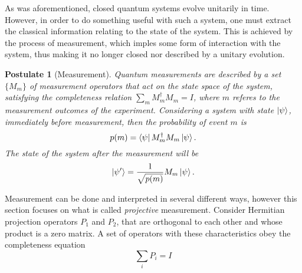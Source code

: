 \documentclass[../../dissertation.tex]{subfiles}
\newtheorem{post}{Postulate}
\begin{document}
As was aforementioned, closed quantum systems evolve unitarily in time.
However, in order to do something useful with such a system, one must extract
the classical information relating to the state of the system. This is achieved
by the process of measurement, which imples some form of interaction with the
system, thus making it no longer closed nor described by a unitary evolution.
\begin{post}[Measurement]
Quantum measurements are described by a set $\{M_m\}$ of measurement operators that act on the state space of the system, satisfying the completeness relation $\sum_m M_m^\dag M_m = I$, where $m$ referes to the measurement outcomes of the experiment. Considering a system with state $\ket{\psi}$, immediately before measurement, then the probability of event $m$ is
\begin{equation}
	p(m) = \bra{\psi} M_m^\dag M_m \ket{\psi}.
\end{equation}
The state of the system after the measurement will be
\begin{equation}
\ket{\psi'} = \frac{1}{\sqrt{p(m)}} M_m \ket{\psi}.
\end{equation}
\end{post}\par
Measurement can be done and interpreted in several different ways, however this
section focuses on what is called \textit{projective} measurement. Consider
Hermitian projection operators $P_1$ and $P_2$, that are orthogonal to each
other and whose product is a zero matrix. A set of operators with these
characteristics obey the completeness equation 
\begin{equation}
	\sum_i P_i = I
\end{equation}
\end{document}
